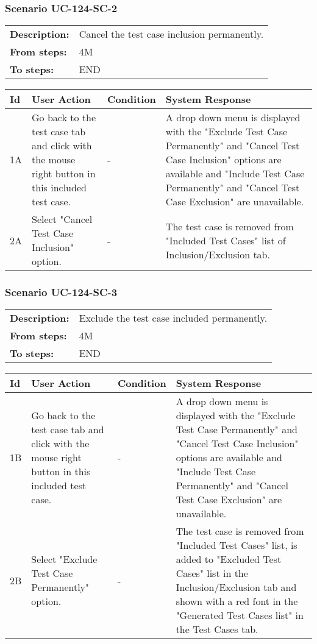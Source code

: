 \documentclass[a4paper,11pt]{article}
\newcommand{\bl}{\\ \hline}
\begin{document}
\subsubsection*{Scenario UC-124-SC-2}
\begin{tabular}{p{1in}p{4in}}
{\bf Description:} & Cancel the test case inclusion permanently. \\
{\bf From steps:} & 4M \\
{\bf To steps:} & END \\
\end{tabular}
 
\begin{tabular}{|p{0.8in}|p{1.6in}|p{1.6in}|p{1.6in}|}
\hline
Id & User Action & Condition & System Response  \bl 
1A & Go back to the test case tab and click with the mouse right button in this included test case. & - & A drop down menu is displayed with the "Exclude Test Case Permanently" and "Cancel Test Case Inclusion" options are available and "Include Test Case Permanently" and "Cancel Test Case Exclusion" are unavailable. \bl 
2A & Select "Cancel Test Case Inclusion" option. & - & The test case is removed from "Included Test Cases" list of Inclusion/Exclusion tab. \bl 
\end{tabular}
\subsubsection*{Scenario UC-124-SC-3}
\begin{tabular}{p{1in}p{4in}}
{\bf Description:} & Exclude the test case included permanently. \\
{\bf From steps:} & 4M \\
{\bf To steps:} & END \\
\end{tabular}
 
\begin{tabular}{|p{0.8in}|p{1.6in}|p{1.6in}|p{1.6in}|}
\hline
Id & User Action & Condition & System Response  \bl 
1B & Go back to the test case tab and click with the mouse right button in this included test case. & - & A drop down menu is displayed with the "Exclude Test Case Permanently" and "Cancel Test Case Inclusion" options are available and "Include Test Case Permanently" and "Cancel Test Case Exclusion" are unavailable. \bl 
2B & Select "Exclude Test Case Permanently" option. & - & The test case is removed from "Included Test Cases" list, is added to "Excluded Test Cases" list in the Inclusion/Exclusion tab and shown with a red font in the "Generated Test Cases list" in the Test Cases tab. \bl 
\end{tabular}
\end{document}
